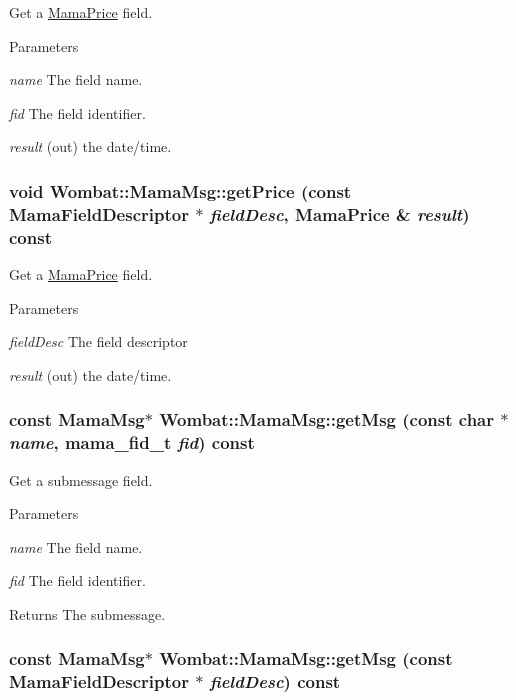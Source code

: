 Get a \hyperlink{classWombat_1_1MamaPrice}{MamaPrice} field. 
\begin{DoxyParams}{Parameters}
\item[{\em name}]The field name. \item[{\em fid}]The field identifier. \item[{\em result}](out) the date/time. \end{DoxyParams}
\hypertarget{classWombat_1_1MamaMsg_ae6883111d8b7dae35e217f1ff3bca05f}{
\subsubsection[{getPrice}]{\setlength{\rightskip}{0pt plus 5cm}void Wombat::MamaMsg::getPrice (const {\bf MamaFieldDescriptor} $\ast$ {\em fieldDesc}, \/  {\bf MamaPrice} \& {\em result}) const}}
\label{classWombat_1_1MamaMsg_ae6883111d8b7dae35e217f1ff3bca05f}


Get a \hyperlink{classWombat_1_1MamaPrice}{MamaPrice} field. 
\begin{DoxyParams}{Parameters}
\item[{\em fieldDesc}]The field descriptor \item[{\em result}](out) the date/time. \end{DoxyParams}
\hypertarget{classWombat_1_1MamaMsg_acac1f64580def4825e5e54965c17c99e}{
\subsubsection[{getMsg}]{\setlength{\rightskip}{0pt plus 5cm}const {\bf MamaMsg}$\ast$ Wombat::MamaMsg::getMsg (const char $\ast$ {\em name}, \/  mama\_\-fid\_\-t {\em fid}) const}}
\label{classWombat_1_1MamaMsg_acac1f64580def4825e5e54965c17c99e}


Get a submessage field. 
\begin{DoxyParams}{Parameters}
\item[{\em name}]The field name. \item[{\em fid}]The field identifier. \end{DoxyParams}
\begin{DoxyReturn}{Returns}
The submessage. 
\end{DoxyReturn}
\hypertarget{classWombat_1_1MamaMsg_a3f28110dc738d89709c283a746d1a710}{
\subsubsection[{getMsg}]{\setlength{\rightskip}{0pt plus 5cm}const {\bf MamaMsg}$\ast$ Wombat::MamaMsg::getMsg (const {\bf MamaFieldDescriptor} $\ast$ {\em fieldDesc}) const}}
\label{classWombat_1_1MamaMsg_a3f28110dc738d89709c283a746d1a710}


